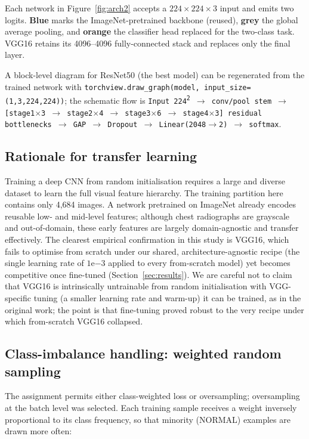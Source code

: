 \documentclass[11pt,a4paper]{article}
\numberwithin{figure}{section}
\numberwithin{table}{section}
\begin{document}
Each network in Figure~\ref{fig:arch2} accepts a $224\times224\times3$ input and emits two logits.
\textcolor{blue!55}{\textbf{Blue}} marks the ImageNet-pretrained backbone (reused),
\textcolor{gray!70}{\textbf{grey}} the global average pooling, and
\textcolor{orange!75!black}{\textbf{orange}} the classifier head replaced for the two-class task. VGG16
retains its 4096--4096 fully-connected stack and replaces only the final layer.

A block-level diagram for ResNet50 (the best model) can be regenerated from the trained network with
\texttt{torchview.draw\_graph(model, input\_size=(1,3,224,224))}; the schematic flow is
\texttt{Input 224\textsuperscript{2} $\rightarrow$ conv/pool stem $\rightarrow$ [stage1$\times$3
$\rightarrow$ stage2$\times$4 $\rightarrow$ stage3$\times$6 $\rightarrow$ stage4$\times$3] residual
bottlenecks $\rightarrow$ GAP $\rightarrow$ Dropout $\rightarrow$ Linear(2048$\rightarrow$2) $\rightarrow$
softmax}.

\subsection{Rationale for transfer learning}
Training a deep CNN from random initialisation requires a large and diverse dataset to learn the full
visual feature hierarchy. The training partition here contains only 4{,}684 images. A network pretrained
on ImageNet \cite{imagenet} already encodes reusable low- and mid-level features; although chest
radiographs are grayscale and out-of-domain, these early features are largely domain-agnostic and
transfer effectively. The clearest empirical confirmation in this study is VGG16, which fails to optimise
from scratch under our shared, architecture-agnostic recipe (the single learning rate of
$1\mathrm{e}{-3}$ applied to every from-scratch model) yet becomes competitive once fine-tuned
(Section~\ref{sec:results}). We are careful not to claim that VGG16 is intrinsically untrainable from
random initialisation with VGG-specific tuning (a smaller learning rate and warm-up) it can be trained,
as in the original work; the point is that fine-tuning proved robust to the very recipe under which
from-scratch VGG16 collapsed.

\subsection{Class-imbalance handling: weighted random sampling}
\label{sec:imbalance}
The assignment permits either class-weighted loss or oversampling; oversampling at the batch level was
selected. Each training sample receives a weight inversely proportional to its class frequency, so that
minority (NORMAL) examples are drawn more often:
\end{document}
